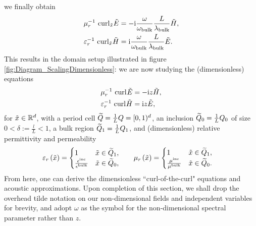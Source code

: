 we finally obtain
\begin{align*}
	\mu_r^{-1} \ \mathrm{curl}_{\tilde{x}}\tilde{E} 
	&= -\mathrm{i}\frac{\omega}{\omega_{\mathrm{bulk}}} \frac{L}{\lambda_{\mathrm{bulk}}} \tilde{H}, \\
	\varepsilon_r^{-1} \ \mathrm{curl}_{\tilde{x}}\tilde{H} 
	&= \mathrm{i}\frac{\omega}{\omega_{\mathrm{bulk}}} \frac{L}{\lambda_{\mathrm{bulk}}} \tilde{E}.
\end{align*}
This results in the domain setup illustrated in figure \ref{fig:Diagram_ScalingDimensionless}: we are now studying the (dimensionless) equations
\begin{subequations}
	\begin{align} \label{eq:Intro-NonDimMaxwell}
		\mu_r^{-1} \ \mathrm{curl}_{}\tilde{E} 
		&= -\mathrm{i} z \tilde{H}, \\
		\varepsilon_r^{-1} \ \mathrm{curl}_{}\tilde{H} 
		&= \mathrm{i} z \tilde{E},
	\end{align}
\end{subequations}
for $\tilde{x}\in\mathbb{R}^d$, with a period cell $\widetilde{Q} = \frac{1}{L}Q = [0,1)^d$, an inclusion $\widetilde{Q}_0 = \frac{1}{L} Q_0$ of size $0<\delta:=\frac{l}{L}<1$, a bulk region $\widetilde{Q}_1 = \frac{1}{L}Q_1$, and (dimensionless) relative permittivity and permeability
\begin{align*}
	\varepsilon_r\left( \tilde{x} \right) = 
	\begin{cases} 
		1 & \tilde{x}\in\widetilde{Q}_1, \\ 
		\frac{\epsilon^{\mathrm{inc}}}{\epsilon^{\mathrm{bulk}}} & \tilde{x}\in\widetilde{Q}_0, 
	\end{cases}
	&\qquad
	\mu_r\left( \tilde{x} \right) = 
	\begin{cases} 
		1 & \tilde{x}\in\widetilde{Q}_1, \\ 
		\frac{\mu^{\mathrm{inc}}}{\mu^{\mathrm{bulk}}} & \tilde{x}\in\widetilde{Q}_0.
	\end{cases}
\end{align*}
From here, one can derive the dimensionless ``curl-of-the-curl" equations and acoustic approximations.
Upon completion of this section, we shall drop the overhead tilde notation on our non-dimensional fields and independent variables for brevity, and adopt $\omega$ as the symbol for the non-dimensional spectral parameter rather than $z$.

